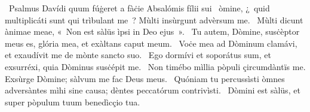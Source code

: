 {~Psalmus Davídi quum fúġeret a fàċie Absalómis fílii sui}
{%
~òmine, ¿~quid multiplicáti sunt qui trìbulant me~? Mùlti insùrgunt advèrsum me.
~Mùlti dicunt ànimae meae, «~Non est sàlüs ìpsi in Deo ejus~».
~Tu autem, Dòmine, susċèptor meus es, glória mea, et exàltans caput meum.
~Voċe mea ad Dòminum clamávi, et exaudívit me de mònte sancto suo.
~Ego dormívi et soporátus sum, et exsurréxi, quia Dòminus susċépit me.
~Non timébo mìllia pòpuli çircumdàntïs me. Exsùrge Dòmine; sàlvum me fac Deus meus.
~Quóniam tu percussìsti òmnes adversàntes mìhi sine causa; dèntes peccatórum contrivìsti.
~Dòmini est sàlüs, et super pòpulum tuum benedìcçio tua.}
